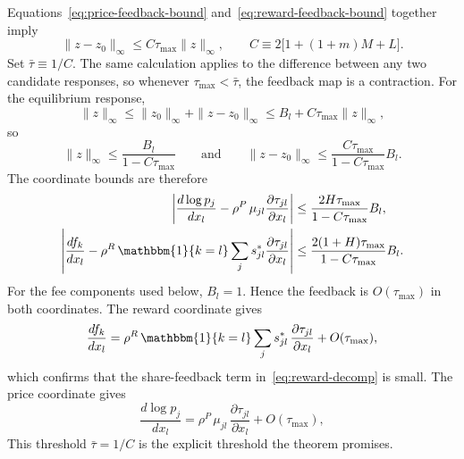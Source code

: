 \documentclass[main.tex]{subfiles}
\begin{document}
Equations~\eqref{eq:price-feedback-bound} and~\eqref{eq:reward-feedback-bound} together imply
\begin{equation}
\|z-z_0\|_\infty\leq C\tau_{\max}\|z\|_\infty,
\qquad
C\equiv2\bigl[1+(1+m)M+L\bigr].
\label{eq:contraction-bound}
\end{equation}
Set $\bar\tau\equiv1/C$.
The same calculation applies to the difference between any two candidate responses, so whenever $\tau_{\max}<\bar\tau$, the feedback map is a contraction.
For the equilibrium response,
\[
\|z\|_\infty
\leq \|z_0\|_\infty+\|z-z_0\|_\infty
\leq B_l+C\tau_{\max}\|z\|_\infty,
\]
so
\[
\|z\|_\infty\leq\frac{B_l}{1-C\tau_{\max}}
\qquad\text{and}\qquad
\|z-z_0\|_\infty
\leq\frac{C\tau_{\max}}{1-C\tau_{\max}}B_l .
\]
The coordinate bounds are therefore
\begin{align}
\left|
\frac{d\log p_j}{dx_l}
-\rho^P\,\mu_{jl}\frac{\partial\tau_{jl}}{\partial x_l}
\right|
&\leq
\frac{2H\tau_{\max}}{1-C\tau_{\max}}B_l,
\label{eq:price-step-explicit}\\
\left|
\frac{df_k}{dx_l}
-\rho^R\,\mathbbm{1}\{k=l\}\sum_j s^*_{jl}\frac{\partial\tau_{jl}}{\partial x_l}
\right|
&\leq
\frac{2(1+H)\tau_{\max}}{1-C\tau_{\max}}B_l .
\label{eq:reward-step-explicit}
\end{align}
For the fee components used below, $B_l=1$.
Hence the feedback is $O(\tau_{\max})$ in both coordinates.
The reward coordinate gives
\begin{equation}
\frac{df_k}{dx_l}=\rho^R\,\mathbbm{1}\{k=l\}\sum_j s^*_{jl}\,\frac{\partial\tau_{jl}}{\partial x_l}+O(\tau_{\max}),
\label{eq:rewards-step}
\end{equation}
which confirms that the share-feedback term in~\eqref{eq:reward-decomp} is small.
The price coordinate gives
\begin{equation}
\frac{d\log p_j}{dx_l}=\rho^P\,\mu_{jl}\,\frac{\partial\tau_{jl}}{\partial x_l}+O(\tau_{\max}),
\label{eq:price-step}
\end{equation}
This threshold $\bar\tau=1/C$ is the explicit threshold the theorem promises.

\end{document}
